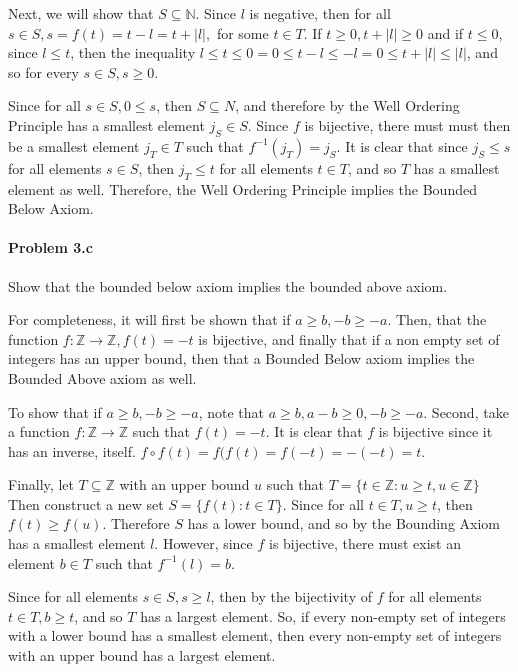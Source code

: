 \documentclass[12pt, letterpaper]{article}
\begin{document}
 Next, we will show that \(S \subseteq \mathbb{N}\).
 Since \(l\) is negative, then for all \( s \in S, s = f(t) = t - l = t + \left|l\right|,\) for some \(t \in T\).
 If \(t \geq 0, t + \left|l\right| \geq 0\) and if \(t \leq 0\), since \(l \leq t\), then the inequality \( l \leq t \leq 0 = 0 \leq t - l \leq -l = 0 \leq t + \left|l\right| \leq \left|l\right|\), and so for every \(s \in S, s \geq 0\).
 
 Since for all \(s \in S, 0 \leq s\), then \(S \subseteq N\), and therefore by the Well Ordering Principle has a smallest element \(j_S \in S\). Since \(f\) is bijective, there must must then be a smallest element \(j_T \in T\) such that \(f^{-1}(j_T) = j_S\). It is clear that since \(j_S \leq s\) for all elements \(s \in S\), then \(j_T \leq t\) for all elements \(t \in T\), and so \(T\) has a smallest element as well.
Therefore, the Well Ordering Principle implies the Bounded Below Axiom.

\paragraph {Problem 3.c} Show that the bounded below axiom implies the bounded above axiom.

For completeness, it will first be shown that if \(a \geq b, -b \geq -a\). Then, that the function \(f: \mathbb{Z} \rightarrow \mathbb{Z}, f(t) = -t\) is bijective, and finally that if a non empty set of integers has an upper bound, then that a Bounded Below axiom implies the Bounded Above axiom as well.

To show that if \(a \geq b, -b \geq -a\), note that \(a \geq b, a-b \geq 0, -b \geq -a\). 
Second, take a function \(f: \mathbb{Z} \rightarrow \mathbb{Z}\) such that \(f(t) = -t\). It is clear that \(f\) is bijective since it has an inverse, itself. \(f \circ f(t) = f(f(t) = f(-t) = -(-t) = t\).

Finally, let \(T \subseteq \mathbb{Z}\) with an upper bound \(u\) such that \( T = \{t \in \mathbb{Z}:  u \geq t, u \in \mathbb{Z}\}\)  
Then construct a new set \(S = \{f(t) : t \in T \}\). 
Since for all \(t\in T, u \geq t\), then \(f(t) \geq f(u)\). 
Therefore  \(S\) has a lower bound, and so by the Bounding Axiom has a smallest element \(l\). 
However, since \(f\) is bijective, there must exist an element \(b \in T\) such that \(f^{-1}(l) = b\). 

Since for all elements \(s \in S, s \geq l\), then by the bijectivity of \(f\) for all elements \(t \in T, b \geq t\), and so \(T\) has a largest element. So, if every non-empty set of integers with a lower bound has a smallest element, then every non-empty set of integers with an upper bound has a largest element.
\end{document}
